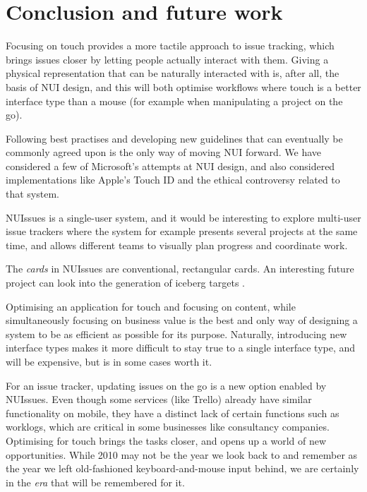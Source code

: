 \section{Conclusion and future work}

Focusing on touch provides a more tactile approach to issue tracking, which brings issues closer by letting people actually interact with them. Giving a physical representation that can be naturally interacted with is, after all, the basis of NUI design, and this will both optimise workflows where touch is a better interface type than a mouse (for example when manipulating a project on the go).

Following best practises and developing new guidelines that can eventually be commonly agreed upon is the only way of moving NUI forward. We have considered a few of Microsoft's attempts at NUI design, and also considered implementations like Apple's Touch ID and the ethical controversy related to that system.

NUIssues is a single-user system, and it would be interesting to explore multi-user issue trackers where the system for example presents several projects at the same time, and allows different teams to visually plan progress and coordinate work.

The \textit{cards} in NUIssues are conventional, rectangular cards. An interesting future project can look into the generation of iceberg targets \autocite[91]{wigdow-wixon:brave-nui-world:2011}.

Optimising an application for touch and focusing on content, while simultaneously focusing on business value is the best and only way of designing a system to be as efficient as possible for its purpose. Naturally, introducing new interface types makes it more difficult to stay true to a single interface type, and will be expensive, but is in some cases worth it.

For an issue tracker, updating issues on the go is a new option enabled by NUIssues. Even though some services (like Trello) already have similar functionality on mobile, they have a distinct lack of certain functions such as worklogs, which are critical in some businesses like consultancy companies. Optimising for touch brings the tasks closer, and opens up a world of new opportunities. While 2010 may not be the year we look back to and remember as the year we left old-fashioned keyboard-and-mouse input behind, we are certainly in the \textit{era} that will be remembered for it.
